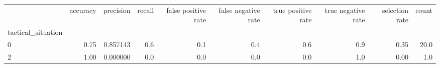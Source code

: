\begin{tabular}{lrrrrrrrrr}
\toprule
{} &  accuracy &  precision &  recall &  false positive rate &  false negative rate &  true positive rate &  true negative rate &  selection rate &  count \\
tactical\_situation &           &            &         &                      &                      &                     &                     &                 &        \\
\midrule
0                  &      0.75 &   0.857143 &     0.6 &                  0.1 &                  0.4 &                 0.6 &                 0.9 &            0.35 &   20.0 \\
2                  &      1.00 &   0.000000 &     0.0 &                  0.0 &                  0.0 &                 0.0 &                 1.0 &            0.00 &    1.0 \\
\bottomrule
\end{tabular}
